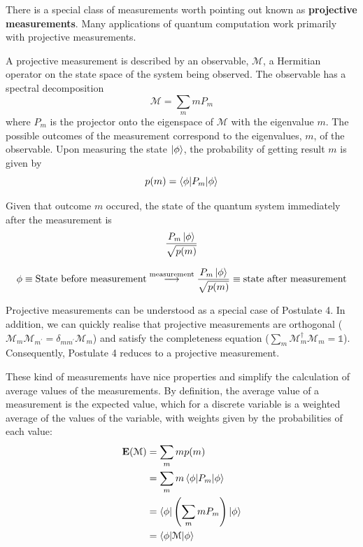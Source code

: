 There is a special class of measurements worth pointing out known as \textbf{projective measurements}. Many applications of quantum computation work primarily with projective measurements. 
\begin{definicion}
    A projective measurement is described by an observable, $\mathcal{M}$, a Hermitian operator on the state space of the system being observed. The observable has a spectral decomposition
    $$\mathcal{M}= \sum_m m P_m$$
    where $P_m$ is the projector onto the eigenspace of $\mathcal{M}$ with the eigenvalue $m$. The possible outcomes of the measurement correspond to the eigenvalues, $m$, of the observable. Upon measuring the state $\ket{\phi}$, the probability of getting result $m$ is given by
    $$p(m) = \braket{\phi|P_m|\phi}$$

    Given that outcome $m$ occured, the state of the quantum system immediately after the measurement is 
    $$\frac{P_m \ket{\phi}}{\sqrt{p(m)}}$$

    \begin{equation}
        \phi \equiv \text{State before measurement} \stackrel{\text{measurement}}{\longrightarrow} \frac{P_m \ket{\phi}}{\sqrt{p(m)}} \equiv \text{state after measurement}
    \end{equation}
\end{definicion}

Projective measurements can be understood as a special case of Postulate 4. In addition, we can quickly realise that projective measurements are orthogonal ($\mathcal{M}_m \mathcal{M}_{m^\prime} = \delta_{m m^\prime} \mathcal{M}_m$) and satisfy the completeness equation ($\sum_m \mathcal{M}_m^{\dag} \mathcal{M}_m = \mathbb{1}$). Consequently, Postulate 4 reduces to a projective measurement.

These kind of measurements have nice properties and simplify the calculation of average values of the measurements. By definition, the average value of a measurement is the expected value, which for a discrete variable is a weighted average of the values of the variable, with weights given by the probabilities of each value:
\begin{align}
    \mathbf{E}(\mathcal{M}) &= \sum_m m p(m) \\
    &= \sum_m m \braket{\phi | P_m | \phi} \\
    &= \braket{\phi | \left( \sum_m m P_m \right) | \phi}\\
    &= \braket{\phi | \mathcal{M} | \phi}
\end{align}

